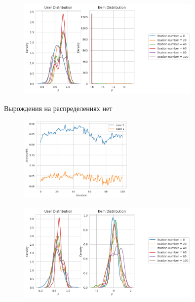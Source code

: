 \documentclass{beamer}
\begin{document}
\begin{frame}
    \begin{figure}
        \centering
        \includegraphics[width=0.8\textwidth]{images/distrChang2.png}
    \end{figure}
    
\end{frame}




\begin{frame}

    Вырождения на распределениях нет
    \begin{figure}
        \centering
        \includegraphics[width=0.5\textwidth]{images/noDegacc.png}
    \end{figure}

    \begin{figure}
        \centering
        \includegraphics[width=0.8\textwidth]{images/noDeg.png}
    \end{figure}


    
\end{frame}
\end{document}
